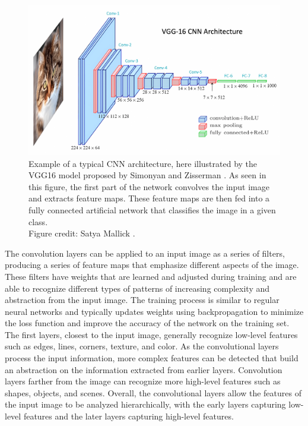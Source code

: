     \begin{figure}[htb]
        \centerline{
        \includegraphics[width=1.1\linewidth]{images/vgg_cnn.png}}
        \caption[Example of a CNN architecture, illustrated by the VGG16 model.]{Example of a typical CNN architecture, here illustrated by the VGG16 model proposed by Simonyan and Zisserman \cite{simonyanVeryDeepConvolutional2015}. As seen in this figure, the first part of the network convolves the input image and extracts feature maps. These feature maps are then fed into a fully connected artificial network that classifies the image in a given class.\\
        Figure credit: Satya Mallick \cite{UnderstandingConvolutionalNeural2023}.}
        \label{fig:vgg_cnn}
    \end{figure}
    
    The convolution layers can be applied to an input image as a series of filters, producing a series of feature maps that emphasize different aspects of the image. These filters have weights that are learned and adjusted during training and are able to recognize different types of patterns of increasing complexity and abstraction from the input image. The training process is similar to regular neural networks and typically updates weights using backpropagation to minimize the loss function and improve the accuracy of the network on the training set. The first layers, closest to the input image, generally recognize low-level features such as edges, lines, corners, texture, and color. As the convolutional layers process the input information, more complex features can be detected that build an abstraction on the information extracted from earlier layers. Convolution layers farther from the image can recognize more high-level features such as shapes, objects, and scenes. Overall, the convolutional layers allow the features of the input image to be analyzed hierarchically, with the early layers capturing low-level features and the later layers capturing high-level features.
    
